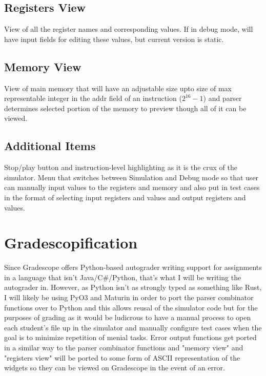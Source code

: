 \documentclass{article}
\begin{document}
\subsection{Registers View}
View of all the register names and corresponding values. If in debug mode, will have input fields for editing these values, but current version is static.
\subsection{Memory View}
View of main memory that will have an adjustable size upto size of max representable integer in the addr field of an instruction ($2^16-1$) and parser determines selected portion of the memory to preview though all of it can be viewed.
\subsection{Additional Items}
Stop/play button and instruction-level highlighting as it is the crux of the simulator. Menu that switches between Simulation and Debug mode so that user can manually input values to the registers and memory and also put in test cases in the format of selecting input registers and values and output registers and values.
\section{Gradescopification}
Since Gradescope offers Python-based autograder writing support for assignments in a language that isn't Java/C\#/Python, that's what I will be writing the autograder in. However, as Python isn't as strongly typed as something like Rust, I will likely be using PyO3 and Maturin in order to port the parser combinator functions over to Python and this allows reusal of the simulator code but for the purposes of grading as it would be ludicrous to have a manual process to open each student's file up in the simulator and manually configure test cases when the goal is to minimize repetition of menial tasks. Error output functions get ported in a similar way to the parser combinator functions and "memory view" and "registers view" will be ported to some form of ASCII representation of the widgets so they can be viewed on Gradescope in the event of an error. 
\end{document}
